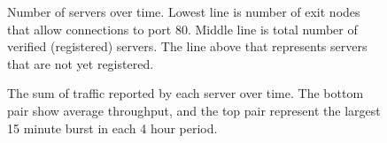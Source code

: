 \documentclass{llncs}
\begin{document}
\clearpage
\appendix

\begin{figure}[t]
\centering
\mbox{}
\caption{Number of servers over time. Lowest line is number of exit
nodes that allow connections to port 80. Middle line is total number of
verified (registered) servers. The line above that represents servers
that are not yet registered.}
\label{fig:graphnodes}
\end{figure}

\begin{figure}[t]
\centering
\mbox{}
\caption{The sum of traffic reported by each server over time. The bottom
pair show average throughput, and the top pair represent the largest 15
minute burst in each 4 hour period.}
\label{fig:graphtraffic}
\end{figure}
\end{document}
